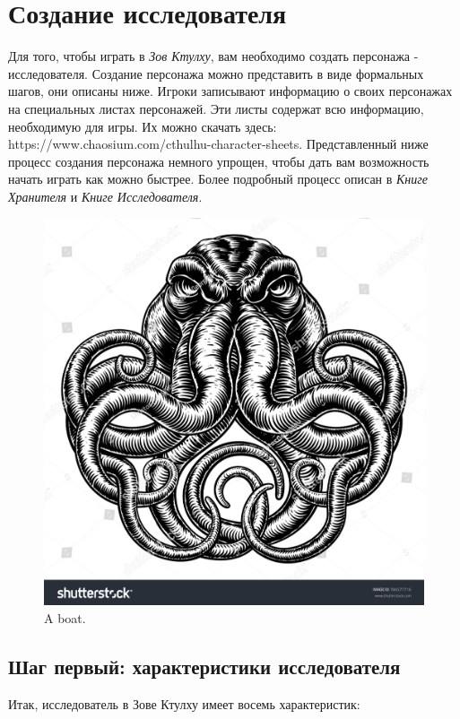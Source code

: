 \documentclass[letterpaper,twocolumn,openany, twoside, 11pt, usenames]{cocbook}
\begin{document}
\section*{\nohyphens{Создание исследователя}}

Для того, чтобы играть в {\it Зов Ктулху}, вам необходимо создать персонажа - исследователя. Создание персонажа можно представить в виде формальных шагов, они описаны ниже. Игроки записывают информацию о своих персонажах на специальных листах персонажей. Эти листы содержат всю информацию, необходимую для игры. Их можно скачать здесь: https://www.chaosium.com/cthulhu-character-sheets.
Представленный ниже процесс создания персонажа немного упрощен, чтобы дать вам возможность начать играть как можно быстрее. Более подробный процесс описан в {\it Книге Хранителя} и {\it Книге Исследователя}.

\begin{figure}
  \includegraphics[width=\linewidth]{img/cthulhu.jpg}
  \caption{A boat.}
  \label{fig:boat1}
\end{figure}

\begin{figure}
\setthemecolor[CoCPaperBox]
\end{figure}

\subsection*{Шаг первый: характеристики исследователя}
Итак, исследователь в Зове Ктулху имеет восемь характеристик:
\end{document}
